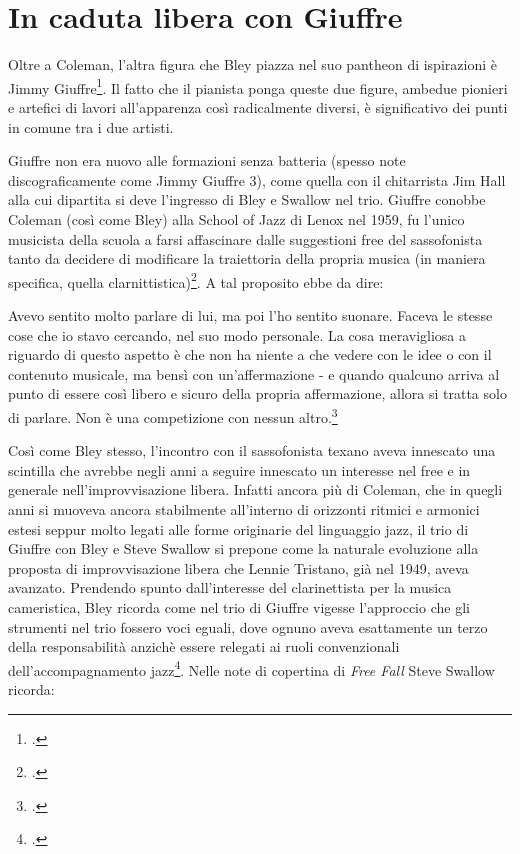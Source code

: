 \section{In caduta libera con Giuffre}
Oltre a Coleman, l'altra figura che Bley piazza nel suo pantheon di ispirazioni è Jimmy Giuffre\footcite{hamilton}. Il fatto che il pianista ponga queste due figure, ambedue pionieri e artefici di lavori all'apparenza così radicalmente diversi, è significativo dei punti in comune tra i due artisti.\par
Giuffre non era nuovo alle formazioni senza batteria (spesso note discograficamente come Jimmy Giuffre 3), come quella con il chitarrista Jim Hall alla cui dipartita si deve l'ingresso di Bley e Swallow nel trio. Giuffre conobbe Coleman (così come Bley) alla School of Jazz di Lenox nel 1959, fu l'unico musicista della scuola a farsi affascinare dalle suggestioni free del sassofonista tanto da decidere di modificare la traiettoria della propria musica (in maniera specifica, quella clarnittistica)\footcite[69]{litweiler}. A tal proposito ebbe da dire:
\begin{fquote}
	Avevo sentito molto parlare di lui, ma poi l'ho sentito suonare. Faceva le stesse cose che io stavo cercando, nel suo modo personale. La cosa meravigliosa a riguardo di questo aspetto è che non ha niente a che vedere con le idee o con il contenuto musicale, ma bensì con un'affermazione - e quando qualcuno arriva al punto di essere così libero e sicuro della propria affermazione, allora si tratta solo di parlare. Non è una competizione con nessun altro.\footcite{stephens}
\end{fquote}
Così come Bley stesso, l'incontro con il sassofonista texano aveva innescato una scintilla che avrebbe negli anni a seguire innescato un interesse nel free e in generale nell'improvvisazione libera. Infatti ancora più di Coleman, che in quegli anni si muoveva ancora stabilmente all'interno di orizzonti ritmici e armonici estesi seppur molto legati alle forme originarie del linguaggio jazz, il trio di Giuffre con Bley e Steve Swallow si prepone come la naturale evoluzione alla proposta di improvvisazione libera che Lennie Tristano, già nel 1949, aveva avanzato. Prendendo spunto dall'interesse del clarinettista per la musica cameristica, Bley ricorda come nel trio di Giuffre vigesse l'approccio che gli strumenti nel trio fossero voci eguali, dove ognuno aveva esattamente un terzo della responsabilità anzichè essere relegati ai ruoli convenzionali dell'accompagnamento jazz\footcite[389]{johnston}. Nelle note di copertina di \textit{Free Fall} Steve Swallow ricorda:
